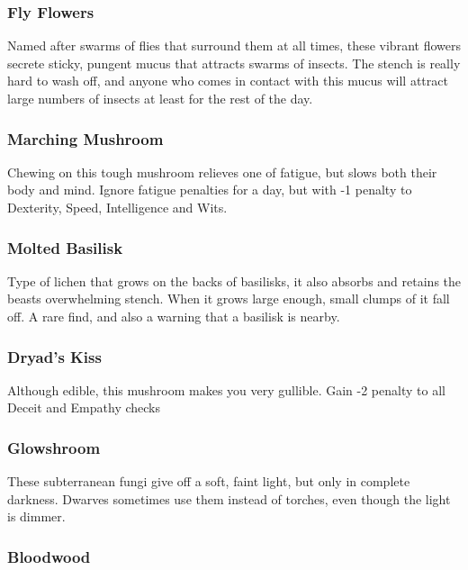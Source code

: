 \begin{multicols}{2}
\subsubsection{Fly Flowers}
\label{fly_flowers}

Named after swarms of flies that surround them at all times, these vibrant flowers secrete sticky, pungent mucus that attracts swarms 
of insects. The stench is really hard to wash off, and anyone who comes in contact with this mucus will attract large numbers of 
insects at least for the rest of the day.

\subsubsection{Marching Mushroom}
\label{marching_mushroom}

Chewing on this tough mushroom relieves one of fatigue, but slows both their body and mind.
Ignore \gls{fatigue} penalties for a day, but 
with -1 penalty to Dexterity, Speed, Intelligence and Wits.

\subsubsection{Molted Basilisk}
\label{molted_basilisk}

Type of lichen that grows on the backs of basilisks, it also absorbs and retains the beasts overwhelming stench. When it grows large 
enough, small clumps of it fall off. A rare find, and also a warning that a basilisk is nearby.

\subsubsection{Dryad's Kiss}
\label{dryads_kiss}

Although edible, this mushroom makes you very gullible. Gain -2 penalty to all Deceit and Empathy checks

\subsubsection{Glowshroom}
\label{glowshroom}

These subterranean fungi give off a soft, faint light, but only in complete darkness. Dwarves sometimes use them instead of torches, 
even though the light is dimmer.

\subsubsection{Bloodwood}
\label{bloodwood}


\end{multicols}
